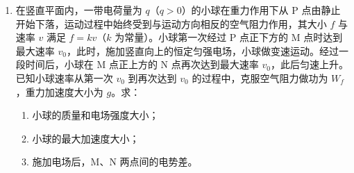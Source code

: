 \documentclass[\gkver]{gaokaozhenti}
\begin{document}
\begin{enumerate}
{（3）时间 $t=0.5\Us=\frac{T}{2}$，则此时的波形为 $t=0$ 时的图像沿 $x$ 轴负方向传播半个周期，$0\sim2.0\Um$ 内的图像为题图中实线关于 $x$ 轴对称的图像，如图所示
}
\item
在竖直平面内，一带电荷量为 $q$（$q>0$）的小球在重力作用下从 P 点由静止开始下落，运动过程中始终受到与运动方向相反的空气阻力作用，其大小 $f$ 与速率 $v$ 满足 $f=kv$（$k$ 为常量）。小球第一次经过 P 点正下方的 M 点时达到最大速率 $v_{0}$，此时，施加竖直向上的恒定匀强电场，小球做变速运动。经过一段时间后，小球在 M 点正上方的 N 点再次达到最大速率 $v_{0}$，此后匀速上升。已知小球速率从第一次 $v_{0}$ 到再次达到 $v_{0}$ 的过程中，克服空气阻力做功为 $W_{f}$，重力加速度大小为 $g$。求：
\begin{enumerate}
	\item
	小球的质量和电场强度大小；
	\item
	小球的最大加速度大小；
	\item
	施加电场后，M、N 两点间的电势差。
\end{enumerate}

\end{enumerate}
\end{document}
